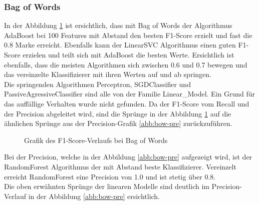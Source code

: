 \subsubsection{Bag of Words}
In der Abbildung \cref{abb:bow-f1} ist ersichtlich, dass mit \glqq Bag of Words\grqq{} der Algorithmus AdaBoost bei 100 Features mit Abstand den besten F1-Score erzielt und fast die 0.8 Marke erreicht.
Ebenfalls kann der LinearSVC Algorithmus einen guten F1-Score erzielen und teilt sich mit AdaBoost die besten Werte.
Ersichtlich ist ebenfalls, dass die meisten Algorithmen sich zwischen 0.6 und 0.7 bewegen und das vereinzelte Klassifizierer mit ihren Werten auf und ab springen.\\
Die springenden Algorithmen Perceptron, SGDClassifier und PassiveAgressiveClassifier sind alle von der Familie \glqq Linear\_Model\grqq{}. Ein Grund für das auffällige Verhalten wurde nicht gefunden.
Da der F1-Score vom Recall und der Precision abgeleitet wird, sind die Sprünge in der Abbildung \cref{abb:bow-f1} auf die ähnlichen Sprünge aus der Precision-Grafik \cref{abb:bow-pre} zurückzuführen.\\
\begin{figure}[H]	
	\setlength{\fboxsep}{0.3pt} 
	\setlength{\fboxrule}{0.3pt} 
	\caption{Grafik des F1-Score-Verlaufs bei Bag of Words}
	\label{abb:bow-f1}
\end{figure}
Bei der Precision, welche in der Abbildung \cref{abb:bow-pre} aufgezeigt wird, ist der RandomForest Algorithmus der mit Abstand beste Klassifizierer.
Vereinzelt erreicht RandomForest eine Precision von 1.0 und ist stetig über 0.8.\\
Die oben erwähnten Sprünge der linearen Modelle sind deutlich im Precision-Verlauf in der Abbildung \cref{abb:bow-pre} ersichtlich.
